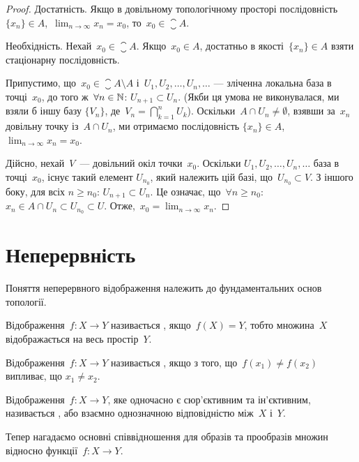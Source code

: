 \begin{proof}
Достатність. Якщо в довільному
топологічному просторі послідовність~$\{x_n\} \in A$,~$\lim_{n \to \infty} x_n = x_0$, то~$x_0 \in \closure{A}$.

Необхідність. Нехай~$x_0 \in \closure{A}$. Якщо~$x_0 \in A$, достатньо в
якості~$\{x_n\} \in A$ взяти стаціонарну послідовність.

Припустимо, що~$x_0 \in \closure{A} \setminus A$ і~$U_1, U_2, \ldots, U_n, \ldots$
--- зліченна локальна база в точці~$x_0$, до того ж~$\forall n \in \mathbb{N}$:
$U_{n + 1} \subset U_n$. (Якби ця умова не виконувалася, ми взяли б іншу базу
$\{V_n\}$, де~$V_n = \bigcap_{k = 1}^n U_k$). Оскільки~$A \cap U_n \ne \emptyset$,
взявши за~$x_n$ довільну точку із~$A \cap U_n$, ми отримаємо послідовність
$\{x_n\} \in A$,~$\lim_{n \to \infty} x_n = x_0$.

Дійсно, нехай~$V$~--- довільний окіл точки~$x_0$. Оскільки
$U_1, U_2, \ldots, U_n, \ldots$ база в точці~$x_0$, існує такий елемент
$U_{n_0}$, який належить цій базі, що~$U_{n_0} \subset V$. З іншого боку, для всіх
$n \ge n_0$: $U_{n + 1} \subset U_n$. Це означає, що~$\forall n \ge n_0$:
$x_n \in A \cap U_n \subset U_{n_0} \subset U$. Отже,~$x_0 = \lim_{n \to \infty} x_n$.
\end{proof}

\section{Неперервність}

Поняття неперервного відображення належить до
фундаментальних основ топології.

\begin{definition}
Відображення~$f: X \to Y$ називається
, якщо~$f(X) = Y$, тобто множина~$X$
відображається на весь простір~$Y$.
\end{definition}

\begin{definition}
Відображення~$f: X \to Y$ називається
, якщо з того, що~$f(x_1) \ne f(x_2)$ випливає, що
$x_1 \ne x_2$.
\end{definition}

\begin{definition}
Відображення~$f: X \to Y$, яке одночасно є
сюр'єктивним та ін'єктивним, називається ,
або взаємно однозначною відповідністю між~$X$ і~$Y$.
\end{definition}

Тепер нагадаємо основні співвідношення для образів та
прообразів множин відносно функції~$f: X \to Y$.

